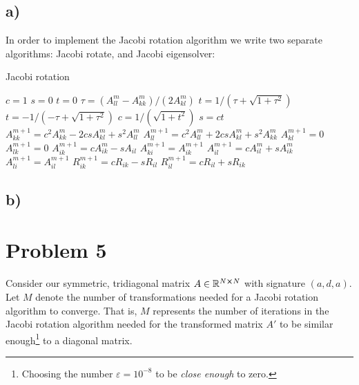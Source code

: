 \documentclass[english,notitlepage,nofootinbib]{revtex4-1}  %
\begin{document}
\subsection*{a)}
In order to implement the Jacobi rotation algorithm we write two separate algorithms: Jacobi rotate, and Jacobi eigensolver:
\begin{algorithm}[H]
    \caption{Jacobi rotation}\label{algo:p4_jacobi_rotation}
    \begin{algorithmic}
            \State $c=1$
            \State $s=0$
            \State $t=0$
        \Else 
            \State $\tau = (A_{ll}^m-A_{kk}^m) / (2A_{kl}^m)$
                \State $t= 1/(\tau + \sqrt{1+\tau^2})$
            \Else
                \State $t = -1/(-\tau + \sqrt{1+\tau^2})$
            \EndIf
            \State $c=1/(\sqrt{1+t^2})$
            \State $s=ct$
        \EndIf
        \State $A_{kk}^{m+1} = c^2A_{kk}^m - 2csA_{kl}^m + s^2A_{ll}^m$
        \State $A_{ll}^{m+1} = c^2A_{ll}^m + 2csA_{kl}^m + s^2A_{kk}^m$
        \State $A_{kl}^{m+1} = 0$
        \State $A_{lk}^{m+1} = 0$
                \State $A_{ik}^{m+1} = cA_{ik}^m -sA_{il} $
                \State $A_{ki}^{m+1} = A_{ik}^{m+1}$
                \State $A_{il}^{m+1} = cA_{il}^m + sA_{ik}^m$
                \State $A_{li}^{m+1} = A_{il}^{m+1}$
            \EndIf
            \State $R_{ik}^{m+1} = cR_{ik} - sR_{il}$
            \State $R_{il}^{m+1} = cR_{il} + sR_{ik}$
        \EndFor
    \end{algorithmic}
\end{algorithm}
\subsection*{b)}



\section*{Problem 5}

Consider our symmetric, tridiagonal matrix $A \in \mathbb{R}^{N\cross N}$ with signature $(a,d,a)$. Let $M$ denote the number of transformations needed for a Jacobi rotation algorithm to converge. That is, $M$ represents the number of iterations in the Jacobi rotation algorithm needed for the transformed matrix $A'$ to be similar enough\footnote{Choosing the number $\varepsilon=10^{-8}$ to be \textit{close enough} to zero.} to a diagonal matrix.
\end{document}
